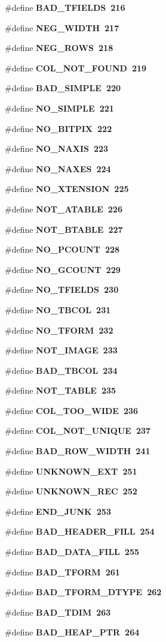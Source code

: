 \begin{CompactItemize}
\item 
\#define \bf{BAD\_\-TFIELDS}~216
\item 
\#define \bf{NEG\_\-WIDTH}~217
\item 
\#define \bf{NEG\_\-ROWS}~218
\item 
\#define \bf{COL\_\-NOT\_\-FOUND}~219
\item 
\#define \bf{BAD\_\-SIMPLE}~220
\item 
\#define \bf{NO\_\-SIMPLE}~221
\item 
\#define \bf{NO\_\-BITPIX}~222
\item 
\#define \bf{NO\_\-NAXIS}~223
\item 
\#define \bf{NO\_\-NAXES}~224
\item 
\#define \bf{NO\_\-XTENSION}~225
\item 
\#define \bf{NOT\_\-ATABLE}~226
\item 
\#define \bf{NOT\_\-BTABLE}~227
\item 
\#define \bf{NO\_\-PCOUNT}~228
\item 
\#define \bf{NO\_\-GCOUNT}~229
\item 
\#define \bf{NO\_\-TFIELDS}~230
\item 
\#define \bf{NO\_\-TBCOL}~231
\item 
\#define \bf{NO\_\-TFORM}~232
\item 
\#define \bf{NOT\_\-IMAGE}~233
\item 
\#define \bf{BAD\_\-TBCOL}~234
\item 
\#define \bf{NOT\_\-TABLE}~235
\item 
\#define \bf{COL\_\-TOO\_\-WIDE}~236
\item 
\#define \bf{COL\_\-NOT\_\-UNIQUE}~237
\item 
\#define \bf{BAD\_\-ROW\_\-WIDTH}~241
\item 
\#define \bf{UNKNOWN\_\-EXT}~251
\item 
\#define \bf{UNKNOWN\_\-REC}~252
\item 
\#define \bf{END\_\-JUNK}~253
\item 
\#define \bf{BAD\_\-HEADER\_\-FILL}~254
\item 
\#define \bf{BAD\_\-DATA\_\-FILL}~255
\item 
\#define \bf{BAD\_\-TFORM}~261
\item 
\#define \bf{BAD\_\-TFORM\_\-DTYPE}~262
\item 
\#define \bf{BAD\_\-TDIM}~263
\item 
\#define \bf{BAD\_\-HEAP\_\-PTR}~264
\item 

\end{CompactItemize}
